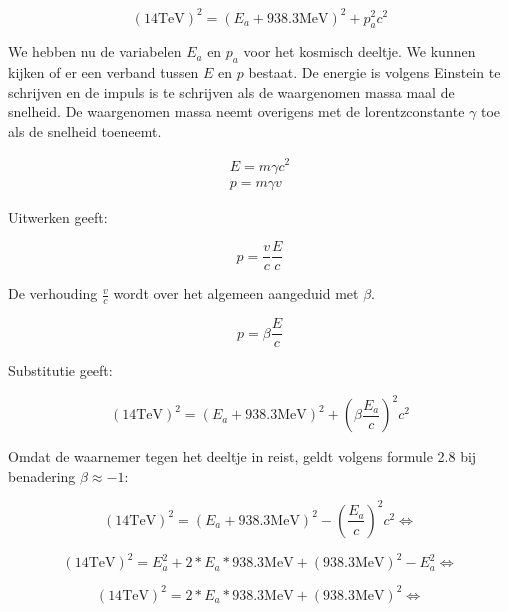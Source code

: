 \begin{equation}
\left(14\mathrm{TeV}\right)^{2}
=\left(E_{a}+938.3\mathrm{MeV}\right)^{2}+p_{a}^{2}c^{2}
\end{equation}


We hebben nu de variabelen $E_{a}$ en $p_{a}$ voor het kosmisch
deeltje. We kunnen kijken of er een verband tussen $E$ en $p$ bestaat.
De energie is volgens Einstein te schrijven en de impuls is te schrijven
als de waargenomen massa maal de snelheid. De waargenomen massa neemt
overigens met de lorentzconstante $\gamma$ toe als de snelheid toeneemt. 

\begin{equation}
\begin{array}{c}
E=m\gamma c^{2}\\
p=m\gamma v
\end{array}
\end{equation}


Uitwerken geeft:

\begin{equation}
p=\frac{v}{c}\frac{E}{c}
\end{equation}


De verhouding $\frac{v}{c}$ wordt over het algemeen aangeduid met
$\beta$.

\begin{equation}
p=\beta\frac{E}{c}
\end{equation}


Substitutie geeft:

\begin{equation}
\left(14\mathrm{TeV}\right)^{2}
=\left(E_{a}+938.3\mathrm{MeV}\right)^{2}+\left(\beta\frac{E_{a}}{c}\right)^{2}c^{2}
\end{equation}


Omdat de waarnemer tegen het deeltje in reist, geldt volgens formule
2.8 bij benadering $\beta\approx-1$:

\begin{equation}
\left(14\mathrm{TeV}\right)^{2}
=\left(E_{a}+938.3\mathrm{MeV}\right)^{2}-\left(\frac{E_{a}}{c}\right)^{2}c^{2}
\Longleftrightarrow
\end{equation}


\begin{equation}
\left(14\mathrm{TeV}\right)^{2}
=E_{a}^{2}+2*E_{a}*938.3\mathrm{MeV}+\left(938.3\mathrm{MeV}\right)^{2}-E_{a}^{2}
\Longleftrightarrow
\end{equation}


\begin{equation}
\left(14\mathrm{TeV}\right)^{2}
=2*E_{a}*938.3\mathrm{MeV}+\left(938.3\mathrm{MeV}\right)^{2}
\Longleftrightarrow
\end{equation}



